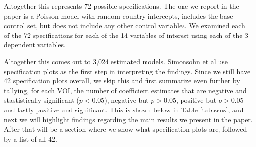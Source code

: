 \documentclass[]{article}
\begin{document}
Altogether this represents 72 possible specifications. The one we report
in the paper is a Poisson model with random country intercepts, includes
the base control set, but does not include any other control variables.
We examined each of the 72 specifications for each of the 14 variables
of interest using each of the 3 dependent variables.

Altogether this comes out to 3,024 estimated models. Simonsohn et al use
specification plots as the first step in interpreting the findings.
Since we still have 42 specification plots overall, we skip this and
first summarize even further by tallying, for each VOI, the number of
coefficient estimates that are negative and stastistically significant
(\(p < 0.05\)), negative but \(p > 0.05\), positive but \(p > 0.05\) and
lastly positive and significant. This is shown below in Table
\ref{tab:sens}, and next we will highlight findings regarding the main
results we present in the paper. After that will be a section where we
show what specification plots are, followed by a list of all 42.
\end{document}
